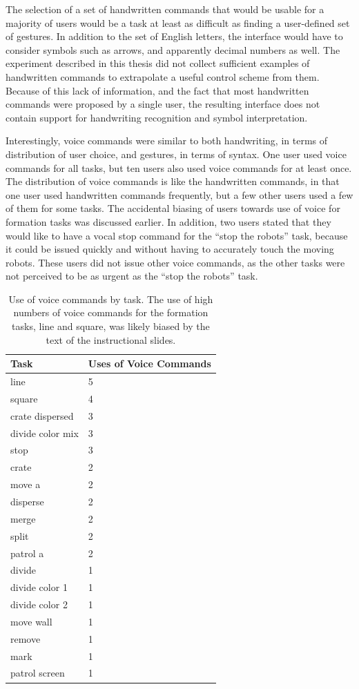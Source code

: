 The selection of a set of handwritten commands that would be usable for a majority of users would be a task at least as difficult as finding a user-defined set of gestures.
In addition to the set of English letters, the interface would have to consider symbols such as arrows, and apparently decimal numbers as well. 
The experiment described in this thesis did not collect sufficient examples of handwritten commands to extrapolate a useful control scheme from them.
Because of this lack of information, and the fact that most handwritten commands were proposed by a single user, the resulting interface does not contain support for handwriting recognition and symbol interpretation.  

Interestingly, voice commands were similar to both handwriting, in terms of distribution of user choice, and gestures, in terms of syntax. 
One user used voice commands for all tasks, but ten users also used voice commands for at least once. 
The distribution of voice commands is like the handwritten commands, in that one user used handwritten commands frequently, but a few other users used a few of them for some tasks.
The accidental biasing of users towards use of voice for formation tasks was discussed earlier. 
In addition, two users stated that they would like to have a vocal stop command for the ``stop the robots'' task, because it could be issued quickly and without having to accurately touch the moving robots. 
These users did not issue other voice commands, as the other tasks were not perceived to be as urgent as the ``stop the robots'' task. 

\begin{table}
	\centering
	\begin{tabular}{l l}
		Task & Uses of Voice Commands\\
		\hline
		line & 5\\
		square & 4 \\
		crate dispersed & 3 \\
		divide color mix & 3\\
		stop & 3\\
		crate & 2\\
		move a & 2\\
		disperse & 2\\
		merge & 2\\
		split & 2\\
		patrol a & 2 \\
		divide & 1 \\
		divide color 1 & 1\\
		divide color 2 & 1\\
		move wall & 1\\
		remove & 1\\
		mark & 1 \\
		patrol screen & 1\\
	\end{tabular}
	\caption{Use of voice commands by task. The use of high numbers of voice commands for the formation tasks, line and square, was likely biased by the text of the instructional slides. }
\end{table}

